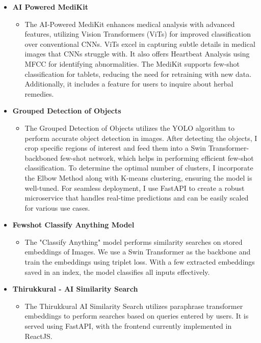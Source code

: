\documentclass[letterpaper,11pt]{article}
\newcommand{\resitem}[1]{\item #1 \vspace{-2pt}}
\newcommand{\resheading}[1]{\textbf{\sffamily{\mbox{~}{\large #1} \vphantom{p\^{E}}}}}
\begin{document}
\resheading{Projects}
\begin{itemize}
\item[]
	\textbf{AI Powered MediKit}
	\vspace{-3mm}
	\begin{itemize}
		\resitem{The AI-Powered MediKit enhances medical analysis with advanced features, utilizing Vision Transformers (ViTs) for improved classification over conventional CNNs. ViTs excel in capturing subtle details in medical images that CNNs struggle with. It also offers Heartbeat Analysis using MFCC for identifying abnormalities. The MediKit supports few-shot classification for tablets, reducing the need for retraining with new data. Additionally, it includes a feature for users to inquire about herbal remedies.}
	\end{itemize}

\item[]
	\textbf{Grouped Detection of Objects}
	\vspace{-3mm}
	\begin{itemize}
		\resitem{The Grouped Detection of Objects utilizes the YOLO algorithm to perform accurate object detection in images. After detecting the objects, I crop specific regions of interest and feed them into a Swin Transformer-backboned few-shot network, which helps in performing efficient few-shot classification. To determine the optimal number of clusters, I incorporate the Elbow Method along with K-means clustering, ensuring the model is well-tuned. For seamless deployment, I use FastAPI to create a robust microservice that handles real-time predictions and can be easily scaled for various use cases.}
	\end{itemize}

\item[]
	\textbf{Fewshot Classify Anything Model}
	\vspace{-3mm}
	\begin{itemize}
	    \resitem{The "Classify Anything" model performs similarity searches on stored embeddings of Images. We use a Swin Transformer as the backbone and train the embeddings using triplet loss. With a few extracted embeddings saved in an index, the model classifies all inputs effectively.}
	\end{itemize}

\item[]
	\textbf{Thirukkural - AI Similarity Search}
	\vspace{-3mm}
	\begin{itemize}
		\resitem{The Thirukkural AI Similarity Search utilizes paraphrase transformer embeddings to perform searches based on queries entered by users. It is served using FastAPI, with the frontend currently implemented in ReactJS.}
	\end{itemize}

\end{itemize}
\end{document}
